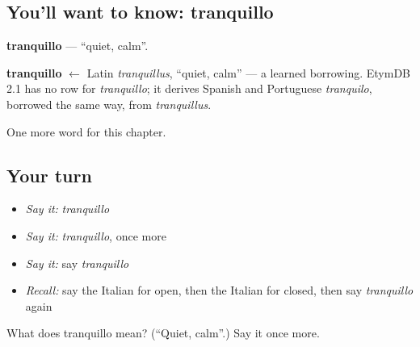 \subsection*{You'll want to know: tranquillo}
\textbf{tranquillo} — \textquotedblleft{}quiet, calm\textquotedblright{}.

\begin{cousinweb}
\textbf{tranquillo} $\leftarrow$ Latin \emph{tranquillus}, \textquotedblleft{}quiet, calm\textquotedblright{} — a learned borrowing. EtymDB 2.1 has no row for \emph{tranquillo}; it derives Spanish and Portuguese \emph{tranquilo}, borrowed the same way, from \emph{tranquillus}.
\end{cousinweb}

\begin{grammarlens}[title={What you've built}]
One more word for this chapter.
\end{grammarlens}

\subsection*{Your turn}
\begin{itemize}
\raggedright
  \item \emph{Say it:} \emph{tranquillo}
  \item \emph{Say it:} \emph{tranquillo}, once more
  \item \emph{Say it:} say \emph{tranquillo}
  \item \emph{Recall:} say the Italian for open, then the Italian for closed, then say \emph{tranquillo} again
\end{itemize}

\begin{tcolorbox}[breakable,colback=teal!4,colframe=teal!35!black,title={Before you move on}]
What does tranquillo mean? (\textquotedblleft{}Quiet, calm\textquotedblright{}.) Say it once more.
\end{tcolorbox}
